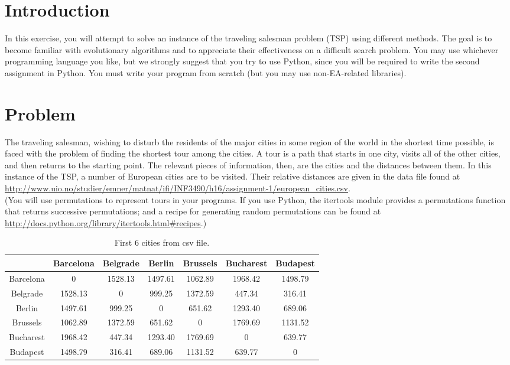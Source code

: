 \documentclass{article}           %
\begin{document}
\section*{Introduction}
In this exercise, you will attempt to solve an instance of the traveling
salesman problem (TSP) using different methods. The goal is to become familiar
with evolutionary algorithms and to appreciate their effectiveness on a
difficult search problem. You may use
whichever programming language you like, but we strongly suggest that you try
to use Python, since you will be required to write the second assignment in
Python. You must write your program from scratch (but you may use
non-EA-related libraries).

\section*{Problem}

The traveling salesman, wishing to disturb the residents of the major cities
in some region of the world in the shortest time possible, is faced with the
problem of finding the shortest tour among the cities. A tour is a path that
starts in one city, visits all of the other cities, and then returns to the
starting point. The relevant pieces of information, then, are the cities and
the distances between them. In this instance of the TSP, a number of European
cities are to be visited. Their relative distances are given in the data file
found at
\url{http://www.uio.no/studier/emner/matnat/ifi/INF3490/h16/assignment-1/european_cities.csv}.\\
(You will use permutations to represent tours in your programs. If you use
Python, the itertools module provides a permutations function that returns
successive permutations; and a recipe for generating random permutations
can be found at
\url{http://docs.python.org/library/itertools.html#recipes}.)

\begin{table}[]
\centering
  \begin{tabular}{|c|c|c|c|c|c|c|}
    \hline
              & Barcelona & Belgrade & Berlin  & Brussels & Bucharest & Budapest \\ \hline
    Barcelona & 0         & 1528.13  & 1497.61 & 1062.89  & 1968.42   & 1498.79  \\ \hline
    Belgrade  & 1528.13   & 0        & 999.25  & 1372.59  & 447.34    & 316.41   \\ \hline
    Berlin    & 1497.61   & 999.25   & 0       & 651.62   & 1293.40   & 689.06   \\ \hline
    Brussels  & 1062.89   & 1372.59  & 651.62  & 0        & 1769.69   & 1131.52  \\ \hline
    Bucharest & 1968.42   & 447.34   & 1293.40 & 1769.69  & 0         & 639.77   \\ \hline
    Budapest  & 1498.79   & 316.41   & 689.06  & 1131.52  & 639.77    & 0        \\ \hline
  \end{tabular}
  \caption{First 6 cities from csv file.}
  \label{tab:cities}
\end{table}
\end{document}
